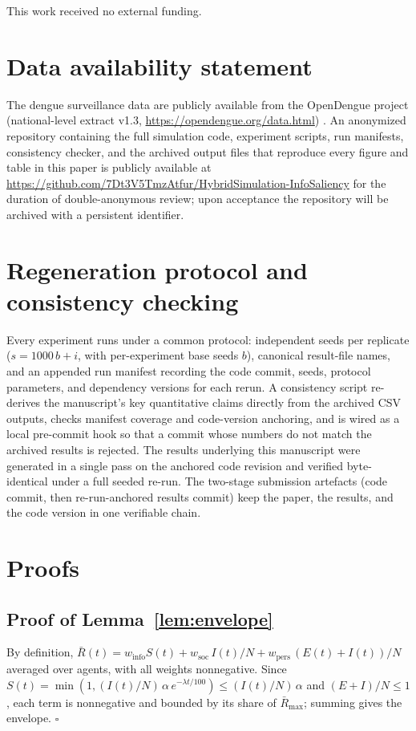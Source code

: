\documentclass[]{interact}
\begin{document}
This work received no external funding.

\section*{Data availability statement}

The dengue surveillance data are publicly available from the OpenDengue project (national-level extract v1.3, \url{https://opendengue.org/data.html}) \cite{opendengue2024}. An anonymized repository containing the full simulation code, experiment scripts, run manifests, consistency checker, and the archived output files that reproduce every figure and table in this paper is publicly available at \url{https://github.com/7Dt3V5TmzAtfur/HybridSimulation-InfoSaliency} for the duration of double-anonymous review; upon acceptance the repository will be archived with a persistent identifier.

\appendix

\section{Regeneration protocol and consistency checking}

Every experiment runs under a common protocol: independent seeds per replicate ($s = 1000\,b + i$, with per-experiment base seeds $b$), canonical result-file names, and an appended run manifest recording the code commit, seeds, protocol parameters, and dependency versions for each rerun. A consistency script re-derives the manuscript's key quantitative claims directly from the archived CSV outputs, checks manifest coverage and code-version anchoring, and is wired as a local pre-commit hook so that a commit whose numbers do not match the archived results is rejected. The results underlying this manuscript were generated in a single pass on the anchored code revision and verified byte-identical under a full seeded re-run. The two-stage submission artefacts (code commit, then re-run-anchored results commit) keep the paper, the results, and the code version in one verifiable chain.

\section{Proofs}\label{app:proofs}

\subsection*{Proof of Lemma~\ref{lem:envelope}}
By definition, $\bar{R}(t) = w_{\mathrm{info}} S(t) + w_{\mathrm{soc}}\, I(t)/N + w_{\mathrm{pers}}\,(E(t)+I(t))/N$ averaged over agents, with all weights nonnegative. Since $S(t) = \min(1, (I(t)/N)\,\alpha\, e^{-\lambda t/100}) \le (I(t)/N)\,\alpha$ and $(E+I)/N \le 1$, each term is nonnegative and bounded by its share of $\bar{R}_{\max}$; summing gives the envelope. $\square$
\end{document}
